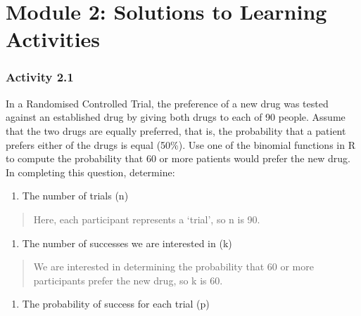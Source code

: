 \documentclass[
]{memoir}
\providecommand{\tightlist}{%
  \setlength{\itemsep}{0pt}\setlength{\parskip}{0pt}}
\begin{document}
\hypertarget{module-2-solutions-to-learning-activities}{%
\chapter*{Module 2: Solutions to Learning Activities}\label{module-2-solutions-to-learning-activities}}

\hypertarget{activity-2.1}{%
\subsection*{Activity 2.1}\label{activity-2.1}}

In a Randomised Controlled Trial, the preference of a new drug was tested against an established drug by giving both drugs to each of 90 people. Assume that the two drugs are equally preferred, that is, the probability that a patient prefers either of the drugs is equal (50\%). Use one of the binomial functions in R to compute the probability that 60 or more patients would prefer the new drug. In completing this question, determine:

\begin{enumerate}
\def\labelenumi{\alph{enumi})}
\tightlist
\item
  The number of trials (n)
\end{enumerate}

\begin{quote}
Here, each participant represents a `trial', so n is 90.
\end{quote}

\begin{enumerate}
\def\labelenumi{\alph{enumi})}
\setcounter{enumi}{1}
\tightlist
\item
  The number of successes we are interested in (k)
\end{enumerate}

\begin{quote}
We are interested in determining the probability that 60 or more participants prefer the new drug, so k is 60.
\end{quote}

\begin{enumerate}
\def\labelenumi{\alph{enumi})}
\setcounter{enumi}{2}
\tightlist
\item
  The probability of success for each trial (p)
\end{enumerate}
\end{document}
